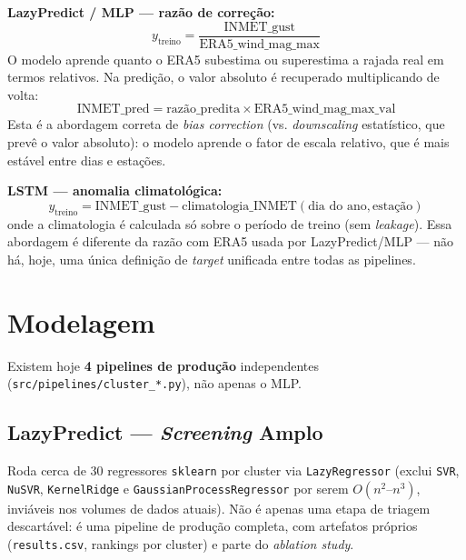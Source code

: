 \documentclass[11pt,a4paper]{article}
\begin{document}
\noindent \textbf{LazyPredict / MLP --- razão de correção:}
\begin{equation}
y_{\text{treino}} = \frac{\text{INMET\_gust}}{\text{ERA5\_wind\_mag\_max}}
\end{equation}
O modelo aprende quanto o ERA5 subestima ou superestima a rajada real em termos relativos. Na predição, o valor absoluto é recuperado multiplicando de volta:
\begin{equation}
\text{INMET\_pred} = \text{razão\_predita} \times \text{ERA5\_wind\_mag\_max\_val}
\end{equation}
Esta é a abordagem correta de \textit{bias correction} (vs. \textit{downscaling} estatístico, que prevê o valor absoluto): o modelo aprende o fator de escala relativo, que é mais estável entre dias e estações.

\noindent \textbf{LSTM --- anomalia climatológica:}
\begin{equation}
y_{\text{treino}} = \text{INMET\_gust} - \text{climatologia\_INMET}(\text{dia do ano}, \text{estação})
\end{equation}
onde a climatologia é calculada só sobre o período de treino (sem \textit{leakage}). Essa abordagem é diferente da razão com ERA5 usada por LazyPredict/MLP --- não há, hoje, uma única definição de \textit{target} unificada entre todas as pipelines.

\section{Modelagem}
\label{sec:modelagem}
Existem hoje \textbf{4 pipelines de produção} independentes (\texttt{src/pipelines/cluster\_*.py}), não apenas o MLP.

\subsection{LazyPredict --- \textit{Screening} Amplo}
Roda cerca de 30 regressores \texttt{sklearn} por cluster via \texttt{LazyRegressor} (exclui \texttt{SVR}, \texttt{NuSVR}, \texttt{KernelRidge} e \texttt{GaussianProcessRegressor} por serem $O(n^2\text{--}n^3)$, inviáveis nos volumes de dados atuais). Não é apenas uma etapa de triagem descartável: é uma pipeline de produção completa, com artefatos próprios (\texttt{results.csv}, rankings por cluster) e parte do \textit{ablation study}.
\end{document}
